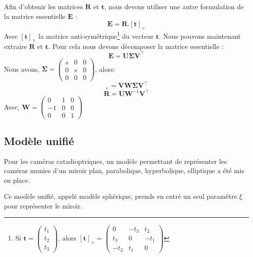 Afin d'obtenir les matrices $\mathbf{R}$ et $\mathbf{t}$, nous devons utiliser une autre formulation de la matrice essentielle $\mathbf{E}$ :
\begin{equation}
\mathbf{E} = \mathbf{R} . [\mathbf{t}]_\times
\end{equation}
Avec $[\mathbf{t}]_\times$ la matrice anti-symétrique\footnote{Si $\mathbf{t}=\begin{pmatrix}t_1\\t_2\\t_3\end{pmatrix}$, alors $[\mathbf{t}]_\times=\begin{pmatrix}0&-t_3&t_2\\t_3&0&-t_1\\-t_2&t_1&0\end{pmatrix}$} du vecteur $\mathbf{t}$.
Nous pouvons maintenant extraire $\mathbf{R}$ et $\mathbf{t}$. Pour cela nous devons décomposer la matrice essentielle :
$$\mathbf{E}=\mathbf{U} \mathbf{\Sigma} \mathbf{V}^{\top}$$
Nous avons, $\mathbf{\Sigma} = \begin{pmatrix}s&0&0\\0&s&0\\0&0&0\end{pmatrix}$, alors:
\begin{equation}
[\mathbf{t}]_\times = \mathbf{V} \mathbf{W} \mathbf{\Sigma} \mathbf{V}^{\top}
\end{equation}
\begin{equation}
\mathbf{R} = \mathbf{U} \mathbf{W}^{-1} \mathbf{V}^{\top}
\end{equation}
Avec, $\mathbf{W}=\begin{pmatrix}0&1&0\\-1&0&0\\0&0&1\end{pmatrix}$




\subsection{Modèle unifié}

Pour les caméras catadioptriques, un modèle permettant de représenter les caméras munies d'un miroir plan, parabolique, hyperbolique, elliptique a été mis en place.

Ce modèle unifié, appelé modèle sphérique, prends en entré un seul paramètre $\xi$ pour représenter le miroir.


